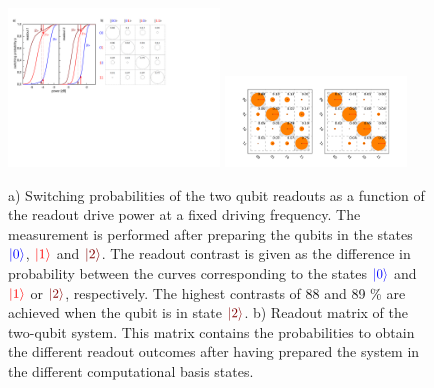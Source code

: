 \begin{figure}[ht!]
	\centering
		\includegraphics[width=0.5\textwidth]{"./material/papers/grover/figures/s curves"}
\includegraphics[width=0.43\textwidth]{"./data/ct5/2011_04_21 - grover and tomo/good_data/readout only"}
	\caption[Switching probabilities of the two qubit readouts as a function of the readout excitation power]{a) Switching probabilities of the two qubit readouts as a function of the readout drive power at a fixed driving frequency. The measurement is performed after preparing the qubits in the states $\color{blue}{\left| 0 \right>}$, $\color{red}{\left| 1 \right>}$ and $\color{brown}{\ket{2}}$. The readout contrast is given as the difference in probability between the curves corresponding to the states $\color{blue}{\left| 0 \right>}$ and $\color{red}{\left| 1 \right>}$ or $\color{brown}{\ket{2}}$, respectively. The highest contrasts of 88 and 89 \% are achieved when the qubit is in state $\color{brown}{\ket{2}}$. b) Readout matrix of the two-qubit system. This matrix contains the probabilities to obtain  the different   readout outcomes after having prepared the system in the different   computational basis states.  }
	\label{fig:qubit_readout_characteristics}
\end{figure}

